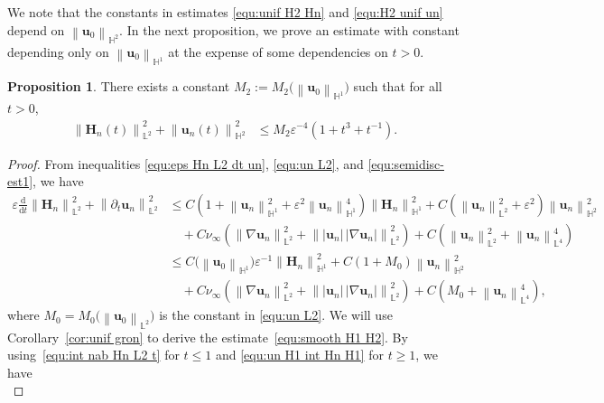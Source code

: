 \documentclass[11pt, reqno]{amsart}
\theoremstyle{definition}
\newtheorem{proposition}[theorem]{Proposition}
\numberwithin{equation}{section}
\newcommand{\bff}{\boldsymbol}
\newcommand{\bb}{\mathbb}
\newcommand{\ddt}{\frac{\mathrm{d}}{\mathrm{d}t}}
\newcommand{\norm}[2]{\left\|{#1}\right\|_{#2}}
\begin{document}
We note that the constants in estimates \eqref{equ:unif H2 Hn} and \eqref{equ:H2 unif un} depend on $\norm{\bff{u}_0}{\bb{H}^2}$. In the next proposition, we prove an estimate with constant depending only on $\norm{\bff{u}_0}{\bb{H}^1}$ at the expense of some dependencies on $t>0$.

\begin{proposition}\label{pro:H2 H1 smooth}
There exists a constant $M_2:=M_2\big(\norm{\bff{u}_0}{\bb{H}^1}\big)$ such that for all $t>0$,
\begin{align}
	\label{equ:smooth H1 H2}
    \norm{\bff{H}_n(t)}{\bb{L}^2}^2
    +
    \norm{\bff{u}_n(t)}{\bb{H}^2}^2
    &\leq
    M_2 \varepsilon^{-4} (1+t^3+t^{-1}).
\end{align}
\end{proposition}

\begin{proof}
From inequalities \eqref{equ:eps Hn L2 dt un}, \eqref{equ:un L2}, and \eqref{equ:semidisc-est1}, we have
    \begin{align}\label{equ:eps Hn L2 dt un 2}
		\varepsilon \ddt \norm{\bff{H}_n}{\bb{L}^2}^2
		+
		\norm{\partial_t \bff{u}_n}{\bb{L}^2}^2
		&\leq
		C \left(1+\norm{\bff{u}_n}{\bb{H}^1}^2 + \varepsilon^2 \norm{\bff{u}_n}{\bb{H}^1}^4 \right) \norm{\bff{H}_n}{\bb{H}^1}^2
		+
		C \left(\norm{\bff{u}_n}{\bb{L}^2}^2 + \varepsilon^2\right) \norm{\bff{u}_n}{\bb{H}^2}^2
		\nonumber\\
		&\quad
		+
		C \nu_\infty
		\left( \norm{\nabla \bff{u}_n}{\bb{L}^2}^2
		+
		\norm{|\bff{u}_n|\, |\nabla \bff{u}_n|}{\bb{L}^2}^2 \right)
		+
		C\left(\norm{\bff{u}_n}{\bb{L}^2}^2 +\norm{\bff{u}_n}{\bb{L}^4}^4\right)
        \nonumber \\
        &\leq
        C\big(\norm{\bff{u}_0}{\bb{H}^1}\big) \varepsilon^{-1} \norm{\bff{H}_n}{\bb{H}^1}^2
        +
        C(1+M_0) \norm{\bff{u}_n}{\bb{H}^2}^2
        \nonumber \\
        &\quad+
        C\nu_\infty
		\left( \norm{\nabla \bff{u}_n}{\bb{L}^2}^2
		+
		\norm{|\bff{u}_n|\, |\nabla \bff{u}_n|}{\bb{L}^2}^2 \right)
		+
		C\left(M_0 +\norm{\bff{u}_n}{\bb{L}^4}^4\right),
	\end{align}
    where $M_0= M_0\big(\norm{\bff{u}_0}{\bb{L}^2}\big)$ is the constant in \eqref{equ:un L2}. We will use Corollary~\ref{cor:unif gron} to derive the estimate~\eqref{equ:smooth H1 H2}.
By using~\eqref{equ:int nab Hn L2 t} for $t\leq 1$ and \eqref{equ:un H1 int Hn H1} for $t\geq 1$, we have
\begin{equation}\label{equ:int t t1 Hn}

\end{equation}
\end{proof}
\end{document}
